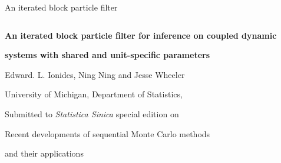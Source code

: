 \documentclass[12pt]{article}\usepackage[]{graphicx}\usepackage[]{xcolor}
\begin{document}

\renewcommand{\baselinestretch}{1.45}


{\hfill {\footnotesize\rm An iterated block particle filter} \hfill}

\renewcommand{\thefootnote}{}
$\ $\par


\fontsize{12}{14pt plus.8pt minus .6pt}\selectfont \vspace{0.8pc}
\centerline{\large\bf An iterated block particle filter for inference on coupled dynamic}
\vspace{2pt} 
\centerline{\large\bf systems with shared and unit-specific parameters}
\vspace{.4cm} 
\centerline{Edward. L. Ionides, Ning Ning and Jesse Wheeler}
\vspace{.4cm} 
\centerline{University of Michigan, Department of Statistics,}

 \vspace{.55cm} \fontsize{9}{11.5pt plus.8pt minus.6pt}\selectfont


\centerline{Submitted to {\it Statistica Sinica} special edition on}
\centerline{Recent developments of sequential Monte Carlo methods}
\centerline{and their applications}


\end{document}
